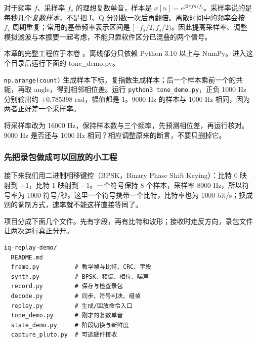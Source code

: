 对于频率 $f$、采样率 $f_s$ 的理想复数单音，样本是 $x[n]=e^{j2\pi fn/f_s}$。采样率说的是每秒几个\emph{复数样本}，不是把 I、Q 分别数一次后再翻倍。离散时间中的频率会按 $f_s$ 周期重复；常用的基带频率表示区间是 $[-f_s/2,f_s/2)$。因此提高采样率、调整模拟滤波与本振要一起考虑，不能只靠软件区分已混叠的两个信号。
\begin{example}
本章的完整工程位于本卷 。离线部分只依赖 Python 3.10 以上与 NumPy。进入这个目录后运行下面的 tone\_demo.py。
\begin{sdrblock}

\end{sdrblock}
\texttt{np.arange(count)} 生成样本下标，复指数生成样本；后一个样本乘前一个的共轭，再取 angle，得到相邻相位差。运行 \texttt{python3 tone\_demo.py}，正负 1000 Hz 分别输出约 $\pm0.785398$ rad，幅值都是 1。9000 Hz 的样本与 1000 Hz 相同，因为两者正好差一个采样率。
\end{example}
\begin{exercise}\label{ex:v2-sdr-iq}
将采样率改为 16000 Hz，保持样本数与三个频率，先预测相位差，再运行核对。9000 Hz 是否还与 1000 Hz 相同？相应调整原来的断言，不要只删掉它。
\end{exercise}

\subsubsection{先把录包做成可以回放的小工程}
接下来我们用二进制相移键控（BPSK，Binary Phase Shift Keying）：比特 0 映射到 $+1$，比特 1 映射到 $-1$。一个符号保持 8 个样本，采样率 8000 Hz，所以符号率为 1000 符号/秒。这里一个符号携带一个比特，比特率也为 1000 bit/s；换成别的调制方式，速率就不能这样直接等同了。

项目分成下面几个文件。先有字段，再有比特和波形；接收时走反方向，录包文件让两次运行真正分开。
\begin{sdrblock}
\begin{lstlisting}[language={}]
iq-replay-demo/
  README.md
  frame.py          # 教学帧与比特、CRC、字段
  synth.py          # BPSK、频偏、相位、噪声
  record.py         # 保存与检查录包
  decode.py         # 同步、符号判决、组帧
  replay.py         # 生成/回放命令入口
  tone_demo.py      # 刚才的复数单音
  state_demo.py     # 阶段切换与新鲜度
  capture_pluto.py  # 可选硬件接收
\end{lstlisting}
\end{sdrblock}


